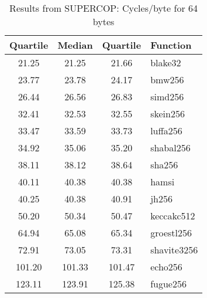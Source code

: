 \begin{table}
  \centering
  \begin{tabular}{ | c | c | c | l | }
    \hline
    \textbf{Quartile} & \textbf{Median} & \textbf{Quartile} & \textbf{Function} \\ \hline
    21.25 & 21.25 & 21.66 & blake32 \\ \hline
    23.77 & 23.78 & 24.17 & bmw256 \\ \hline
    26.44 & 26.56 & 26.83 & simd256 \\ \hline
    32.41 & 32.53 & 32.55 & skein256 \\ \hline
    33.47 & 33.59 & 33.73 & luffa256 \\ \hline
    34.92 & 35.06 & 35.20 & shabal256 \\ \hline
    38.11 & 38.12 & 38.64 & sha256 \\ \hline
    40.11 & 40.38 & 40.38 & hamsi \\ \hline
    40.25 & 40.38 & 40.91 & jh256 \\ \hline
    50.20 & 50.34 & 50.47 & keccakc512 \\ \hline
    64.94 & 65.08 & 65.34 & groestl256 \\ \hline
    72.91 & 73.05 & 73.31 & shavite3256 \\ \hline
    101.20 & 101.33 & 101.47 & echo256 \\ \hline
    123.11 & 123.91 & 125.38 & fugue256 \\ \hline
  \end{tabular}
  \caption{Results from SUPERCOP: Cycles/byte for 64 bytes}
  \label{tbl:supercop:64}
\end{table}
